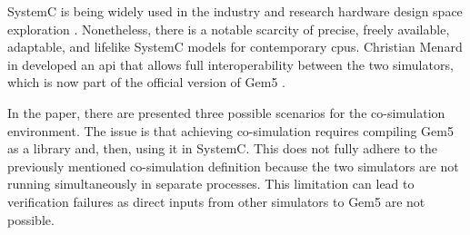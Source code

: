 SystemC is being widely used in the industry and research hardware design space exploration \cite{menard2017system}. Nonetheless, there 
is a notable scarcity of precise, freely available, adaptable, and lifelike SystemC models for contemporary \glspl{cpu}. Christian Menard 
in \cite{menard2017system} developed an \gls{api} that allows full interoperability between the two simulators, which is now part of the 
official version of Gem5 \cite{Thegem5simulatorV2}. 

In the paper, there are presented three possible scenarios for the co-simulation environment. The issue is that achieving 
co-simulation requires compiling Gem5 as a library and, then, using it in SystemC. This does not fully adhere to the previously mentioned 
co-simulation definition because the two simulators are not running simultaneously in separate processes. This limitation can lead to 
verification failures as direct inputs from other simulators to Gem5 are not possible.

